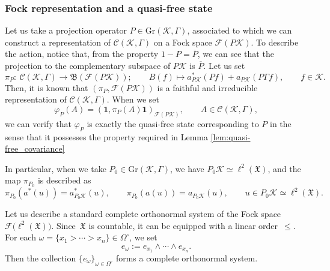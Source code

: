\documentclass[11pt]{article}
\numberwithin{equation}{section}
\numberwithin{equation}{section}
\newcommand{\mfrak}[1]{\mathfrak{#1}}
\newcommand{\mcal}[1]{\mathcal{#1}}
\newcommand{\mrm}[1]{\mathrm{#1}}
\begin{document}
\subsubsection{Fock representation and a quasi-free state}
Let us take a projection operator $P\in\mrm{Gr}(\mcal{K},\Gamma)$, associated to which we can construct a representation of $\mcal{C}(\mcal{K},\Gamma)$ on a Fock space $\mcal{F}(P\mcal{K})$.
To describe the action, notice that, from the property $1-P=\overline{P}$, we can see that the projection to the complementary subspace of $P\mcal{K}$ is $\overline{P}$.
Let us set
\begin{equation*}
	\pi_{P}\colon \ \mcal{C}(\mcal{K},\Gamma)\to \mfrak{B}(\mcal{F}(P\mcal{K}));\qquad B(f)\mapsto a_{P\mcal{K}}^{\ast}(Pf)+a_{P\mcal{K}}(P\Gamma f),\qquad f\in\mcal{K}.
\end{equation*}
Then, it is known that $(\pi_{P},\mcal{F}(P\mcal{K}))$ is a faithful and irreducible representation of $\mcal{C}(\mcal{K},\Gamma)$.
When we set
\begin{equation*}
	\varphi_{P}(A)=(\bm{1}, \pi_{P}(A)\bm{1})_{\mcal{F}(P\mcal{K})},\qquad A\in \mcal{C}(\mcal{K},\Gamma),
\end{equation*}
we can verify that $\varphi_{P}$ is exactly the quasi-free state corresponding to $P$ in the sense that it possesses the property required in Lemma \ref{lem:quasi-free_covariance}

In particular, when we take $P_{0}\in\mrm{Gr}(\mcal{K},\Gamma)$, we have $P_{0}\mcal{K}\simeq \ell^{2}(\mfrak{X})$, and the map $\pi_{P_{0}}$ is described as
\begin{equation*}
	\pi_{P_{0}}(a^{\ast}(u))=a_{P_{0}\mcal{K}}^{\ast}(u),\qquad \pi_{P_{0}}(a(u))=a_{P_{0}\mcal{K}}(u),\qquad u\in P_{0}\mcal{K}\simeq \ell^{2}(\mfrak{X}).
\end{equation*}

Let us describe a standard complete orthonormal system of the Fock space $\mcal{F}\big(\ell^{2}(\mfrak{X})\big)$. Since~$\mfrak{X}$ is countable, it can be equipped with a linear order~$\le$. For each $\omega=\{x_{1}>\cdots>x_{n}\}\in\Omega^{\circ}$, we set
\begin{equation*}
	e_{\omega}:=e_{x_{1}}\wedge\cdots \wedge e_{x_{n}}.
\end{equation*}
Then the collection $\{e_{\omega}\}_{\omega\in\Omega^{\circ}}$ forms a complete orthonormal system.
\end{document}
